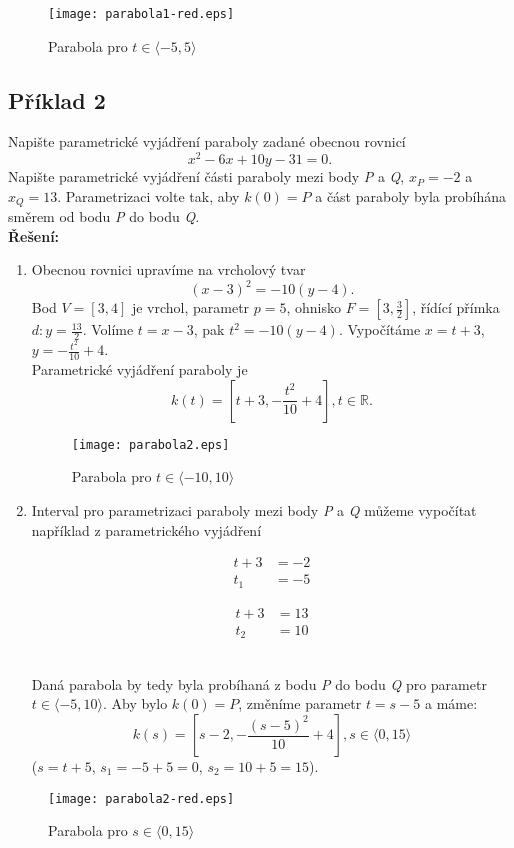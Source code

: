 		\vfill
		\begin{figure}[H]
			\centering
			\texttt{[image: parabola1-red.eps]}
			\caption{Parabola pro $t \in \langle-5, 5\rangle$}					
		\end{figure}
		\clearpage
		\subsection*{Příklad 2}
		Napište parametrické vyjádření paraboly zadané obecnou rovnicí
		$$x^2-6x+10y-31=0.$$
		Napište parametrické vyjádření části paraboly mezi body \textit{P} a \textit{Q}, $x_P = -2$ a $x_Q = 13$.
		Parametrizaci volte tak, aby $k(0) = P$ a část paraboly byla probíhána směrem od bodu \textit{P} do bodu \textit{Q}. \\[5pt]
		\textbf{Řešení:}
		\noindent\begin{enumerate}
		\item Obecnou rovnici upravíme na vrcholový tvar
		$$(x-3)^2=-10(y-4).$$
		Bod $V=[3,4]$ je vrchol, parametr $p=5$, ohnisko $F=\left[3,\frac{3}{2}\right]$,  řídící přímka $d: y=\frac{13}{2}$.
		Volíme $t=x-3$, pak $t^2=-10(y-4)$. Vypočítáme $x=t+3$, $y=-\frac{t^2}{10}+4$.\\
		Parametrické vyjádření paraboly je
		$$k(t)=\left[t+3,-\frac{t^2}{10}+4\right], t \in \mathbb{R}.$$
		\vfill
		\begin{figure}[H]
			\centering
			\texttt{[image: parabola2.eps]}
			\caption{Parabola pro $t \in \langle-10, 10\rangle$}
								
		\end{figure}
		\item
		Interval pro parametrizaci paraboly mezi body \textit{P} a \textit{Q} můžeme vypočítat například z parametrického vyjádření			
								
		\noindent\begin{minipage}[t]{0.5\textwidth}
		\begin{align*}
			t + 3 & = -2 \\
			t_1   & = -5 
		\end{align*}
		\end{minipage}
		\begin{minipage}[t]{0.5\textwidth}
			\begin{align*}
				t + 3 & = 13 \\
				t_2   & = 10 
			\end{align*}
		\end{minipage}
		\\[10pt]
		Daná parabola by tedy byla probíhaná z bodu \textit{P} do bodu \textit{Q} pro parametr \\ $t \in \langle-5, 10\rangle$.
		Aby bylo $k(0) = P$, změníme parametr $t = s - 5$ a máme:
		$$k(s)=\left[s-2,-\frac{(s-5)^2}{10}+4\right], s \in \langle0, 15 \rangle$$
		($s=t+5$, $s_1=-5+5=0$, $s_2=10+5=15$).
		\end{enumerate}
		\vfill
		\begin{figure}[H]
			\centering
			\texttt{[image: parabola2-red.eps]}
			\caption{Parabola pro $s \in \langle0, 15\rangle$}
								
		\end{figure}
		\clearpage
